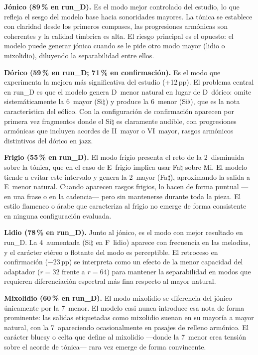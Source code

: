 \documentclass[%
    school=etsisi,%
    type=pfg,%
    degree=61CD,%
]{upm-report}
\begin{document}
\textbf{J\'onico (89\,\% en run\_D).} Es el modo mejor controlado del estudio, lo que refleja el sesgo del modelo base hacia sonoridades mayores. La t\'onica se establece con claridad desde los primeros compases, las progresiones arm\'onicas son coherentes y la calidad t\'imbrica es alta. El riesgo principal es el opuesto: el modelo puede generar j\'onico cuando se le pide otro modo mayor (lidio o mixolidio), diluyendo la separabilidad entre ellos.

\textbf{D\'orico (59\,\% en run\_D; 71\,\% en confirmaci\'on).} Es el modo que experimenta la mejora m\'as significativa del estudio (+12\,pp). El problema central en run\_D es que el modelo genera D~menor natural en lugar de D~d\'orico: omite sistem\'aticamente la 6\textordfeminine\ mayor (Si$\natural$) y produce la 6\textordfeminine\ menor (Si$\flat$), que es la nota caracter\'istica del e\'olico. Con la configuraci\'on de confirmaci\'on aparecen por primera vez fragmentos donde el Si$\natural$ es claramente audible, con progresiones arm\'onicas que incluyen acordes de II~mayor o VI~mayor, rasgos arm\'onicos distintivos del d\'orico en jazz.

\textbf{Frigio (55\,\% en run\_D).} El modo frigio presenta el reto de la 2\textordfeminine\ disminuida sobre la t\'onica, que en el caso de E~frigio implica usar Fa$\natural$ sobre Mi. El modelo tiende a evitar este intervalo y genera la 2\textordfeminine\ mayor (Fa$\sharp$), aproximando la salida a E~menor natural. Cuando aparecen rasgos frigios, lo hacen de forma puntual ---en una frase o en la cadencia--- pero sin mantenerse durante toda la pieza. El estilo flamenco o \'arabe que caracteriza al frigio no emerge de forma consistente en ninguna configuraci\'on evaluada.

\textbf{Lidio (78\,\% en run\_D).} Junto al j\'onico, es el modo con mejor resultado en run\_D. La 4\textordfeminine\ aumentada (Si$\natural$ en F~lidio) aparece con frecuencia en las melodías, y el car\'acter et\'ereo o flotante del modo es perceptible. El retroceso en confirmaci\'on ($-23$\,pp) se interpreta como un efecto de la menor capacidad del adaptador ($r=32$ frente a $r=64$) para mantener la separabilidad en modos que requieren diferenciaci\'on espectral m\'as fina respecto al mayor natural.

\textbf{Mixolidio (60\,\% en run\_D).} El modo mixolidio se diferencia del j\'onico \'unicamente por la 7\textordfeminine\ menor. El modelo casi nunca introduce esa nota de forma prominente: las salidas etiquetadas como mixolidio suenan en su mayor\'ia a mayor natural, con la 7\textordfeminine\ apareciendo ocasionalmente en pasajes de relleno arm\'onico. El car\'acter bluesy o celta que define al mixolidio ---donde la 7\textordfeminine\ menor crea tensi\'on sobre el acorde de t\'onica--- rara vez emerge de forma convincente.
\end{document}
